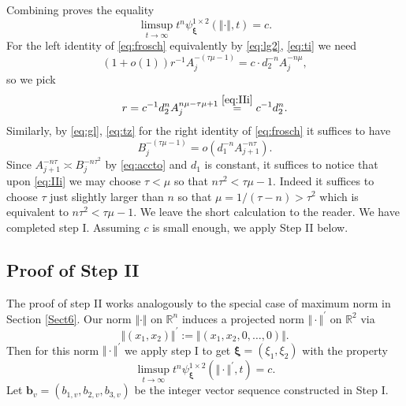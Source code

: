 \documentclass[10pt]{amsart}
\theoremstyle{definition}
\newcommand{\ux}{\boldsymbol{\xi}}
\newcommand{\bb}{\boldsymbol{b}}
\newcommand{\R}{\mathbb{R}}
\begin{document}
Combining proves the equality
\[
\limsup_{t\to\infty} t^n \psi_{\ux}^{1\times 2}(\Vert\cdot\Vert, t) = c.
\]
For the left identity of \eqref{eq:frosch}
equivalently by \eqref{eq:lg2}, \eqref{eq:ti} we need
\[
(1+o(1))r^{-1}A_j^{-(\tau \mu-1) }= c\cdot d_2^{-n} A_j^{-n\mu},
\]
so we pick
\[
r=  c^{-1} d_2^n A_j^{n\mu-\tau \mu+1} \overset{ \eqref{eq:IIi}}{=}c^{-1} d_2^n.
\]
Similarly, by \eqref{eq:gl}, \eqref{eq:tz} for the right identity of \eqref{eq:frosch} it suffices to have
\[
B_j^{-(\tau \mu-1)}= o(d_1^{-n} A_{j+1}^{-n\tau}).
\]
Since $A_{j+1}^{-n\tau} \asymp
B_{j}^{-n\tau^2}$ by \eqref{eq:accto} and $d_1$ is constant,
it suffices to notice that upon \eqref{eq:IIi} we may choose $\tau<\mu$ so that 
$n\tau^2 < \tau \mu-1$. Indeed it suffices to choose $\tau$ just slightly larger than $n$ so that $\mu=1/(\tau-n)>\tau^2$ which is equivalent to $n\tau^2 < \tau \mu-1$.  
We leave the short calculation to the reader.
We have completed step I.
Assuming $c$ is small enough, 
we apply Step II below.

 \subsection{Proof of Step II}  \label{st2}
The proof of step II works analogously to the special case of maximum norm
in Section \ref{Sect6}.
Our norm $\Vert\cdot\Vert$ on $\R^n$ induces a projected norm $\Vert\cdot\Vert^{\prime}$ on $\R^2$ via
\begin{equation}  \label{eq:pno}
\Vert (x_1, x_2) \Vert^{\prime}:= \Vert (x_1,x_2,0,\ldots,0) \Vert.
\end{equation}
Then for this norm $\Vert\cdot\Vert^{\prime}$ we apply step I to get $\ux=(\xi_1, \xi_2)$ with the property
\[
\limsup_{t\to\infty} t^n \psi_{\ux}^{1\times 2}(\Vert\cdot\Vert^{\prime}, t) = c.
\]
Let $\bb_v=(b_{1,v}, b_{2,v}, b_{3,v})$ be the integer
vector sequence constructed in Step I.
\end{document}
